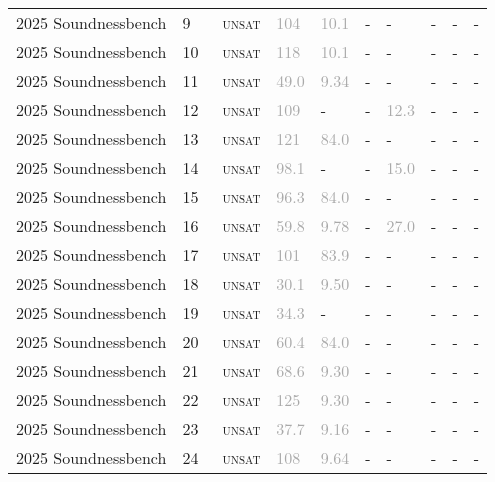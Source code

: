 \begin{center}
{\begin{longtable}{@{}llllllllll@{}}
2025 Soundnessbench & 9 & ~\textsc{unsat} & \textcolor{darkgray}{104} & \textcolor{darkgray}{10.1} & - & - & - & - & - \\
2025 Soundnessbench & 10 & ~\textsc{unsat} & \textcolor{darkgray}{118} & \textcolor{darkgray}{10.1} & - & - & - & - & - \\
2025 Soundnessbench & 11 & ~\textsc{unsat} & \textcolor{darkgray}{49.0} & \textcolor{darkgray}{9.34} & - & - & - & - & - \\
2025 Soundnessbench & 12 & ~\textsc{unsat} & \textcolor{darkgray}{109} & - & - & \textcolor{darkgray}{12.3} & - & - & - \\
2025 Soundnessbench & 13 & ~\textsc{unsat} & \textcolor{darkgray}{121} & \textcolor{darkgray}{84.0} & - & - & - & - & - \\
2025 Soundnessbench & 14 & ~\textsc{unsat} & \textcolor{darkgray}{98.1} & - & - & \textcolor{darkgray}{15.0} & - & - & - \\
2025 Soundnessbench & 15 & ~\textsc{unsat} & \textcolor{darkgray}{96.3} & \textcolor{darkgray}{84.0} & - & - & - & - & - \\
2025 Soundnessbench & 16 & ~\textsc{unsat} & \textcolor{darkgray}{59.8} & \textcolor{darkgray}{9.78} & - & \textcolor{darkgray}{27.0} & - & - & - \\
2025 Soundnessbench & 17 & ~\textsc{unsat} & \textcolor{darkgray}{101} & \textcolor{darkgray}{83.9} & - & - & - & - & - \\
2025 Soundnessbench & 18 & ~\textsc{unsat} & \textcolor{darkgray}{30.1} & \textcolor{darkgray}{9.50} & - & - & - & - & - \\
2025 Soundnessbench & 19 & ~\textsc{unsat} & \textcolor{darkgray}{34.3} & - & - & - & - & - & - \\
2025 Soundnessbench & 20 & ~\textsc{unsat} & \textcolor{darkgray}{60.4} & \textcolor{darkgray}{84.0} & - & - & - & - & - \\
2025 Soundnessbench & 21 & ~\textsc{unsat} & \textcolor{darkgray}{68.6} & \textcolor{darkgray}{9.30} & - & - & - & - & - \\
2025 Soundnessbench & 22 & ~\textsc{unsat} & \textcolor{darkgray}{125} & \textcolor{darkgray}{9.30} & - & - & - & - & - \\
2025 Soundnessbench & 23 & ~\textsc{unsat} & \textcolor{darkgray}{37.7} & \textcolor{darkgray}{9.16} & - & - & - & - & - \\
2025 Soundnessbench & 24 & ~\textsc{unsat} & \textcolor{darkgray}{108} & \textcolor{darkgray}{9.64} & - & - & - & - & - \\

\end{longtable}}
\end{center}
